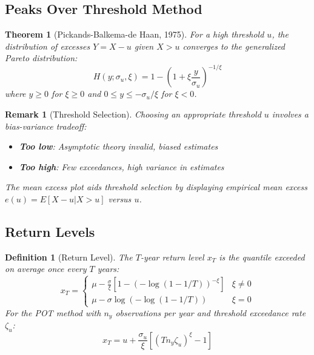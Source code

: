 \documentclass[a4paper, 11pt]{article}
\newtheorem{definition}{Definition}[section]
\newtheorem{theorem}{Theorem}[section]
\newtheorem{remark}{Remark}[section]
\begin{document}
\subsection{Peaks Over Threshold Method}

\begin{theorem}[Pickands-Balkema-de Haan, 1975]
For a high threshold $u$, the distribution of excesses $Y = X - u$ given $X > u$ converges
to the generalized Pareto distribution:
\begin{equation}
H(y; \sigma_u, \xi) = 1 - \left(1 + \xi \frac{y}{\sigma_u}\right)^{-1/\xi}
\end{equation}
where $y \geq 0$ for $\xi \geq 0$ and $0 \leq y \leq -\sigma_u/\xi$ for $\xi < 0$.
\end{theorem}

\begin{remark}[Threshold Selection]
Choosing an appropriate threshold $u$ involves a bias-variance tradeoff:
\begin{itemize}
\item \textbf{Too low}: Asymptotic theory invalid, biased estimates
\item \textbf{Too high}: Few exceedances, high variance in estimates
\end{itemize}
The mean excess plot aids threshold selection by displaying empirical mean excess
$e(u) = E[X - u | X > u]$ versus $u$.
\end{remark}

\subsection{Return Levels}

\begin{definition}[Return Level]
The $T$-year return level $x_T$ is the quantile exceeded on average once every $T$ years:
\begin{equation}
x_T = \begin{cases}
\mu - \frac{\sigma}{\xi}\left[1 - (-\log(1 - 1/T))^{-\xi}\right] & \xi \neq 0 \\
\mu - \sigma \log(-\log(1 - 1/T)) & \xi = 0
\end{cases}
\end{equation}
For the POT method with $n_y$ observations per year and threshold exceedance rate $\zeta_u$:
\begin{equation}
x_T = u + \frac{\sigma_u}{\xi}\left[\left(T n_y \zeta_u\right)^{\xi} - 1\right]
\end{equation}
\end{definition}
\end{document}
